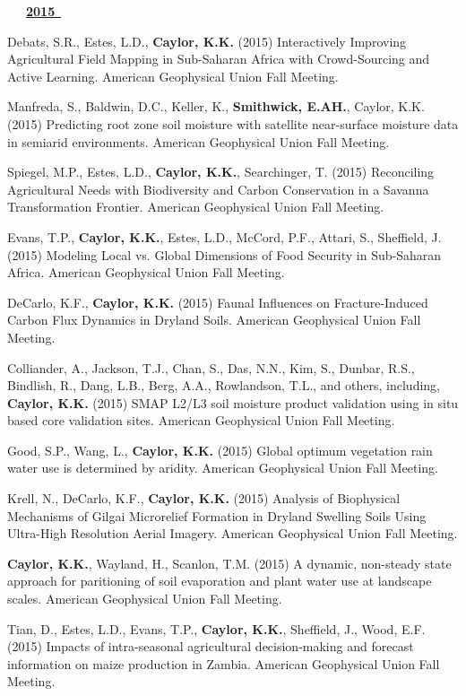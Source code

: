 \begin{etaremune}
\vspace{0.1in}
\mbox{\ \ \ \underline{\textbf{2015 }}}
\vspace{0.1in}

\item Debats, S.R., Estes, L.D., \textbf{ Caylor, K.K.} (2015) Interactively Improving Agricultural Field Mapping in Sub-Saharan Africa with Crowd-Sourcing and Active Learning. American Geophysical Union Fall Meeting.
\item Manfreda, S., Baldwin, D.C., Keller, K., \textbf{ Smithwick, E.AH.}, Caylor, K.K. (2015) Predicting root zone soil moisture with satellite near-surface moisture data in semiarid environments. American Geophysical Union Fall Meeting.
\item Spiegel, M.P., Estes, L.D., \textbf{ Caylor, K.K.}, Searchinger, T. (2015) Reconciling Agricultural Needs with Biodiversity and Carbon Conservation in a Savanna Transformation Frontier. American Geophysical Union Fall Meeting.
\item Evans, T.P., \textbf{ Caylor, K.K.}, Estes, L.D., McCord, P.F., Attari, S., Sheffield, J. (2015) Modeling Local vs. Global Dimensions of Food Security in Sub-Saharan Africa. American Geophysical Union Fall Meeting.
\item DeCarlo, K.F., \textbf{ Caylor, K.K.} (2015) Faunal Influences on Fracture-Induced Carbon Flux Dynamics in Dryland Soils. American Geophysical Union Fall Meeting.
\item Colliander, A., Jackson, T.J., Chan, S., Das, N.N., Kim, S., Dunbar, R.S., Bindlish, R., Dang, L.B., Berg, A.A., Rowlandson, T.L., and others, including, \textbf{ Caylor, K.K.} (2015) SMAP L2/L3 soil moisture product validation using in situ based core validation sites. American Geophysical Union Fall Meeting.
\item Good, S.P., Wang, L., \textbf{ Caylor, K.K.} (2015) Global optimum vegetation rain water use is determined by aridity. American Geophysical Union Fall Meeting.
\item Krell, N., DeCarlo, K.F., \textbf{ Caylor, K.K.} (2015) Analysis of Biophysical Mechanisms of Gilgai Microrelief Formation in Dryland Swelling Soils Using Ultra-High Resolution Aerial Imagery. American Geophysical Union Fall Meeting.
\item \textbf{ Caylor, K.K.}, Wayland, H., Scanlon, T.M. (2015) A dynamic, non-steady state approach for paritioning of soil evaporation and plant water use at landscape scales. American Geophysical Union Fall Meeting.
\item Tian, D., Estes, L.D., Evans, T.P., \textbf{ Caylor, K.K.}, Sheffield, J., Wood, E.F. (2015) Impacts of intra-seasonal agricultural decision-making and forecast information on maize production in Zambia. American Geophysical Union Fall Meeting.

\end{etaremune}
